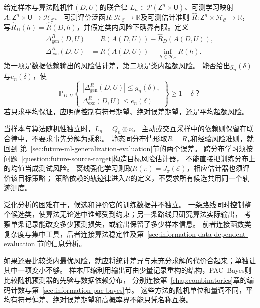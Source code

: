 \begin{mathproblem}[给定学习规则的泛化与超额风险]
  \label{question:future-learned-risk}
  给定样本与算法随机性$(D,U)$的联合律
  $L_n\in\mathcal P(\mathsf Z^n\times\mathsf U)$、可测学习映射
  $A:\mathsf Z^n\times\mathsf U\to\mathcal H_{\mathcal C}$、
  可测评价泛函$R:\mathcal H_{\mathcal C}\to\mathbb R$及可测估计准则
  $\widehat R:\mathsf Z^n\times\mathcal H_{\mathcal C}\to\mathbb R$，
  写$\widehat R_D(h)=\widehat R(D,h)$，并假定类内风险下确界有限。定义
  \[
    \begin{aligned}
      \Delta_{\mathrm{gen}}^R(D,U)
        &=R(A(D,U))-\widehat R_D(A(D,U)),\\
      \Delta_{\mathrm{exc}}^R(D,U)
        &=R(A(D,U))-\inf_{h\in\mathcal H_{\mathcal C}}R(h).
    \end{aligned}
  \]
  第一项是数据依赖输出的风险估计差，第二项是类内超额风险。
  能否给出$g_n(\delta)$与$e_n(\delta)$，使
  \[
    \mathbb P_{D,U}\!\left\{
      \begin{gathered}
        |\Delta_{\mathrm{gen}}^R(D,U)|\leq g_n(\delta),\\
        \Delta_{\mathrm{exc}}^R(D,U)\leq e_n(\delta)
      \end{gathered}
    \right\}\geq1-\delta\text{？}
  \]
  若只求平均保证，应明确控制有符号期望、绝对误差期望，还是平均超额风险。
\end{mathproblem}

当样本与算法随机性独立时，$L_n=Q_n\otimes\nu$。
主动或交互采样中的依赖则保留在联合律中，不要求事先分解为乘积。
静态同分布情形取$R=R_P$和经验风险准则，就回到
第~\ref{sec:future-ml-generalization-evaluation}节的两个误差。
跨分布学习须按问题~\ref{question:future-source-target}构造目标风险估计器，
不能直接把训练分布上的均值当成测试风险。
离线强化学习则取$R(\pi)=J_\pi(\mathcal E)$，相应估计器也须评价该目标策略；
策略依赖的轨迹律进入$R$的定义，不要求所有候选共用同一个轨迹测度。

泛化分析的困难在于，候选和评价它的训练数据并不独立。
一条路线同时控制整个候选类，使算法无论选中谁都受到约束；另一条路线只研究算法实际输出，
考察单条记录能改变多少预测损失，或输出保留了多少样本信息。
前者连接函数类复杂度与集中工具，后者连接算法稳定性及第~\ref{sec:information-data-dependent-evaluation}节的信息分析。

如果还要比较类内最优风险，就应将统计差异与未充分求解的代价合起来；单独让其中一项变小不够。
样本压缩利用输出可由少量记录重构的结构，PAC--Bayes则比较随机预测器的先验与数据依赖分布，
分别连接第~\ref{chap:combinatorics}章的编码计数与第~\ref{sec:information-pac-bayes}节。
这些方法的随机单位和量词不同，平均有符号偏差、绝对误差期望和高概率界不能只凭名称互换。

